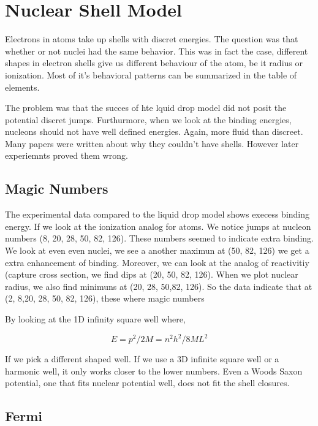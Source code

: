 \documentclass[english, 11pt]{article}
\begin{document}
      \section{Nuclear Shell Model}

        Electrons in atoms take up shells with discret energies. The question was that whether or not nuclei had the same behavior. This was in fact the case, different shapes in electron shells give us different behaviour of the atom, be it radius or ionization. Most of it's behavioral patterns can be summarized in the table of elements.

        The problem was that the succes of hte lquid drop model did not posit the potential discret jumps. Furthurmore, when we look at the binding energies, nucleons should not have well defined energies. Again, more fluid than discreet. Many papers were written about why they couldn't have shells. However later experiemnts proved them wrong.

        \subsection{Magic Numbers}

        The experimental data compared to the liquid drop model shows execess binding energy. If we look at the ionization analog for atoms. We notice jumps at nucleon numbers (8, 20, 28, 50, 82, 126). These numbers seemed to indicate extra binding. We look at even even nuclei, we see a another maximun at (50, 82, 126) we get a extra enhancement of binding. Moreover, we can look at the analog of reactivitiy (capture cross section, we find dips at (20, 50, 82, 126). When we plot nuclear radius, we also find minimuns at (20, 28, 50,82, 126). So the data indicate that at (2, 8,20, 28, 50, 82, 126), these where magic numbers

        By looking at the 1D infinity square well where,

        \[E = p^2/2M = n^2h^2 / 8ML^2 \]

        If we pick a different shaped well. If we use a 3D infinite square well or a harmonic well, it only works closer to the lower numbers. Even a Woods Saxon potential, one that fits nuclear potential well, does not fit the shell closures. 

        \subsection{Fermi}
\end{document}

